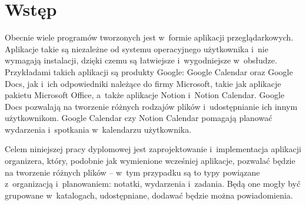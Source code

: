 \documentclass[a4paper,twoside,12pt]{book}
\newcounter{stronyPozaNumeracja}
\begin{document}
\tableofcontents

\setcounter{stronyPozaNumeracja}{\value{page}}
\mainmatter
\pagestyle{empty}

\cleardoublepage

\pagestyle{NumeryStronNazwyRozdzialow}


\chapter{Wstęp}
\label{ch:wstep}


Obecnie wiele programów tworzonych jest w~formie aplikacji przeglądarkowych. Aplikacje takie są niezależne od systemu operacyjnego użytkownika i~nie wymagają instalacji, dzięki czemu są łatwiejsze i~wygodniejsze w~obsłudze.
%
Przykładami takich aplikacji są produkty Google: Google Calendar oraz Google Docs, jak i~ich odpowiedniki należące do firmy Microsoft, takie jak aplikacje pakietu Microsoft Office, a~także aplikacje Notion i~Notion Calendar. Google Docs pozwalają na tworzenie różnych rodzajów plików i~udostępnianie ich innym użytkownikom. Google Calendar czy Notion Calendar pomagają planować wydarzenia i~spotkania w~kalendarzu użytkownika.

Celem niniejszej pracy dyplomowej jest zaprojektowanie i~implementacja aplikacji organizera, który, podobnie jak wymienione wcześniej aplikacje, pozwalać będzie na tworzenie różnych plików -- w~tym przypadku są to typy powiązane z~organizacją i~planowaniem: notatki, wydarzenia i~zadania. Będą one mogły być grupowane w~katalogach, udostępniane, dodawać będzie można powiadomienia. 
\end{document}
